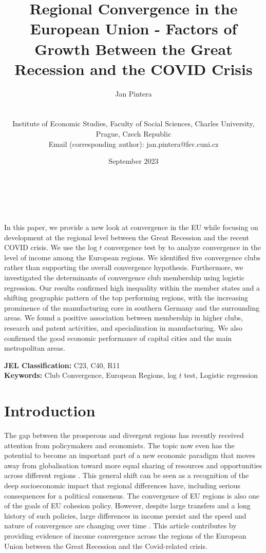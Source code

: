 \documentclass[11pt]{article}
\title{Regional Convergence in the European Union - Factors of Growth Between the Great Recession and the COVID Crisis}
\author{
        \begin{large}Jan Pintera\end{large} \\\vspace{5mm} \begin{small} Institute of Economic Studies, Faculty of Social Sciences, Charles University,\\ Prague, Czech Republic\\
        Email (corresponding author): jan.pintera@fsv.cuni.cz 
        \end{small}
}
\date{September 2023}
\makeatletter
\renewcommand{\maketitle}{\bgroup\setlength{\parindent}{0pt}
\begin{flushright}
  \textbf{\@title}\\
  \vspace{5mm}
  \@author\\
  \vspace{5mm}
  \@date
\end{flushright}\egroup
}
\renewenvironment{abstract}
 {\small
  \begin{flushleft}
  \bfseries \abstractname\vspace{-.5em}\vspace{0pt}
  \end{flushleft}
  \list{}{%
    \setlength{\leftmargin}{0mm}%
    \setlength{\rightmargin}{\leftmargin}%
  }%
  \item\relax}
 {\endlist}
\def \Keywords {Club Convergence, European Regions, log $t$ test, Logistic regression}
\makeatother
\begin{document}
\maketitle


\thispagestyle{empty}
\begin{abstract}
In this paper, we provide a new look at convergence in the EU while focusing on development at the regional level between the Great Recession and the recent COVID crisis. We use the log $t$ convergence test by \citet{phillips2007transition} to analyze convergence in the level of income among the European regions. We identified five convergence clubs rather than supporting the overall convergence hypothesis. Furthermore, we investigated the determinants of convergence club membership using logistic regression. Our results confirmed high inequality within the member states and a shifting geographic pattern of the top performing regions, with the increasing prominence of the manufacturing core in southern Germany and the surrounding areas. We found a positive association between membership in higher clubs, research and patent activities, and specialization in manufacturing. We also confirmed the good economic performance of capital cities and the main metropolitan areas.

\bigskip


\textbf{JEL Classification:} C23, C40, R11 \\
\textbf{Keywords:}  \Keywords \\

\bigskip

\end{abstract}
\clearpage
\setcounter{page}{1}

\section{Introduction}
The gap between the prosperous and divergent regions has recently received attention from policymakers and economists. The topic now even has the potential to become an important part of a new economic paradigm that moves away from globalisation toward more equal sharing of resources and opportunities across different regions \citep{rodrik_2022}. This general shift can be seen as a recognition of the deep socioeconomic impact that regional differences have, including serious consequences for a political consensus. The convergence of EU regions is also one of the goals of EU cohesion policy. However, despite large transfers and a long history of such policies, large differences in income persist and the speed and nature of convergence are changing over time \citep{eckey2007convergence,zarotiadis2013european, iammarino2019regional}.
This article contributes by providing evidence of income convergence across the regions of the European Union between the Great Recession and the Covid-related crisis.
\end{document}
